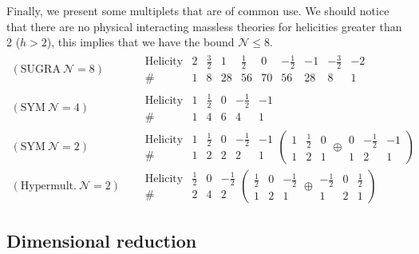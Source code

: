 \documentclass[a4paper,12pt]{article}
\numberwithin{equation}{section}
\numberwithin{exe}{section}
\begin{document}
Finally, we present some multiplets that are of common use. We should notice that there are no physical interacting massless theories for helicities greater than 2 ($h>2$), this implies that we have the bound $\mathcal N\leq 8$.
	\begin{equation}
	\begin{aligned}
	(\text{SUGRA}\ \mathcal N=8)&\quad
		\begin{array}{cccccccccc}
		\text{Helicity} & 2 & \frac32 & 1 & \frac12 & 0 & -\frac12 & -1 & -\frac32 & -2  \\
		\# & 1 & 8 & 28 & 56 & 70 & 56 & 28 & 8 & 1
		\end{array} \\
	(\text{SYM}\ \mathcal N=4)&\quad
		\begin{array}{cccccc}
		\text{Helicity} & 1 & \frac12 & 0 & -\frac12 & -1 \\
		\# & 1 & 4 & 6 & 4 & 1
		\end{array} \\
	(\text{SYM}\ \mathcal N=2)&\quad
		\begin{array}{cccccc}
		\text{Helicity} & 1 & \frac12 & 0 & -\frac12 & -1 \\
		\# & 1 & 2 & 2 & 2 & 1
		\end{array}
	\left(
		\begin{array}{ccc}
		1 & \frac12 & 0 \\
		1 & 2 & 1
		\end{array}
	\oplus
		\begin{array}{ccc}
		0 & -\frac12 & -1 \\
		1 & 2 & 1
		\end{array}
	\right) \\
	(\text{Hypermult.}\ \mathcal N=2)&\quad
		\begin{array}{cccc}
		\text{Helicity} & \frac12 & 0 & -\frac12 \\
		\# & 2 & 4 & 2
		\end{array}
	\left(
		\begin{array}{ccc}
		\frac12 & 0 & -\frac12 \\
		1 & 2 & 1
		\end{array}
	\oplus 
		\begin{array}{ccc}
		-\frac12 & 0 & \frac12 \\
		1 & 2 & 1
		\end{array}
	\right)
	\end{aligned}
	\end{equation}

\subsection{Dimensional reduction}
\end{document}
